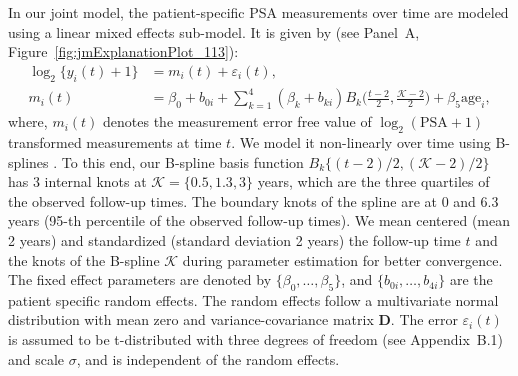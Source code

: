 In our joint model, the patient-specific PSA measurements over time are modeled using a linear mixed effects sub-model. It is given by (see Panel~A, Figure~\ref{fig:jmExplanationPlot_113}):
\begin{equation}
\label{eq:long_model_psa}
\begin{split}
    \log_2 \big\{y_{i}(t) + 1\big\} &= m_{i}(t) + \varepsilon_{i}(t),\\
    m_{i}(t) &= \beta_{0} + b_{0i} + \sum_{k=1}^4 (\beta_{k} + b_{ki})  B_k\Big(\frac{t-2}{2},\frac{\mathcal{K}-2}{2}\Big) + \beta_{5} \mbox{age}_i,
    \end{split}
\end{equation}
where, $m_{i}(t)$ denotes the measurement error free value of $\log_2 (\mbox{PSA} + 1)$ transformed \citep{pearson1994mixed,lin2000latent} measurements at time $t$. We model it non-linearly over time using B-splines \citep{de1978practical}. To this end, our B-spline basis function $B_k\{(t-2)/2,(\mathcal{K}-2)/2\}$ has 3 internal knots at $\mathcal{K} = \{0.5, 1.3, 3\}$ years, which are the three quartiles of the observed follow-up times. The boundary knots of the spline are at 0 and 6.3 years (95-th percentile of the observed follow-up times). We mean centered (mean 2 years) and standardized (standard deviation 2 years) the follow-up time $t$ and the knots of the B-spline $\mathcal{K}$ during parameter estimation for better convergence. The fixed effect parameters are denoted by ${\{\beta_{0},\ldots,\beta_{5}\}}$, and ${\{b_{0i}, \ldots, b_{4i}\}}$ are the patient specific random effects. The random effects follow a multivariate normal distribution with mean zero and variance-covariance matrix $\boldsymbol{D}$. The error $\varepsilon_{i}(t)$ is assumed to be t-distributed with three degrees of freedom (see Appendix~B.1) and scale $\sigma$, and is independent of the random effects. 

